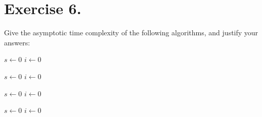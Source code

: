 \documentclass{article}
\begin{document}
\section*{Exercise 6.}
Give the asymptotic time complexity of the following algorithms, and justify your answers:

\begin{minipage}[t]{5cm}
  \vspace{0pt}
  \begin{algorithm}[H]
\DontPrintSemicolon
{}
  $s \leftarrow 0$\;
  $i \leftarrow 0$\;
 \caption{}
\end{algorithm}
\end{minipage}%
\hspace{1cm}
\begin{minipage}[t]{5cm}
  \vspace{0pt}
  \begin{algorithm}[H]
\DontPrintSemicolon
{}
  $s \leftarrow 0$\;
  $i \leftarrow 0$\;
 \caption{}
\end{algorithm}
\end{minipage}


\begin{minipage}[t]{5cm}
  \vspace{0pt}
  \begin{algorithm}[H]
\DontPrintSemicolon
{}
  $s \leftarrow 0$\;
  $i \leftarrow 0$\;
 \caption{}
\end{algorithm}
\end{minipage}%
\hspace{1cm}
\begin{minipage}[t]{5cm}
  \vspace{0pt}
  \begin{algorithm}[H]
\DontPrintSemicolon
{}
  $s \leftarrow 0$\;
  $i \leftarrow 0$\;
 \caption{}
\end{algorithm}
\end{minipage}
\end{document}
